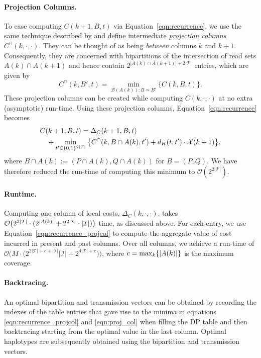 \paragraph{Projection Columns.}
To ease computing $C(k+1,B,t)$ via Equation~\eqref{eqn:recurrence}, we use the same technique described by \cite{Patterson2015} and define intermediate \emph{projection columns} $C^\cap(k,\cdot,\cdot)$.
They can be thought of as being \emph{between} columns $k$ and $k+1$.
Consequently, they are concerned with bipartitions of the intersection of read sets $A(k)\cap A(k+1)$ and hence contain $2^{|A(k)\cap A(k+1)|+2|\mathcal{T}|}$ entries, which are given by
\begin{equation}\label{eqn:proj_col}
C^\cap(k,B',t)=\min_{\mathcal{B}(A(k)):B\simeq B'}\{C(k,B,t)\}.
\end{equation}
These projection columns can be created while computing $C(k,\cdot,\cdot)$ at no extra (asymptotic) run-time.
Using these projection columns, Equation~\eqref{eqn:recurrence} becomes
\begin{align}\label{eqn:recurrence_projcol}
& C(k+1,B,t)= \Delta_C(k+1,B,t)\\
& \quad + \min_{t'\in\{0,1\}^{2{\left\lvert \mathcal{T} \right\rvert}}}\big\{C^\cap(k,B\cap A(k),t')+d_H(t,t')\cdot\mathcal{X}(k+1)\big\}, \nonumber
\end{align}
where $B\cap A(k) := (P\cap A(k), Q\cap A(k))$ for $B=(P,Q)$.
We have therefore reduced the run-time of computing this minimum to $\mathcal{O}(2^{2|\mathcal{T}|})$.

\paragraph{Runtime.}
Computing one column of local costs, $\Delta_C(k,\cdot,\cdot)$, takes $\mathcal{O}\big(2^{2{\left\lvert \mathcal{T} \right\rvert}}\cdot(2^{|A(k)|} +  2^{2|\mathcal{I}|}\cdot |\mathcal{I}|)\big)$ time, as discussed above.
For each entry, we use Equation~\eqref{eqn:recurrence_projcol} to compute the aggregate value of cost incurred in present and past columns.
Over all columns, we achieve a run-time of 
$\mathcal{O}\big(M\cdot \big(2^{2|\mathcal{T}|+c+|\mathcal{I}|}|\mathcal{I}|+2^{4|\mathcal{T}|+c}\big)\big)$, where $c=\max_k\{{\left\lvert A(k) \right\rvert}\}$ is the maximum coverage.

\paragraph{Backtracing.}
An optimal bipartition and transmission vectors can be obtained by recording the indexes of the table entries that gave rise to the minima in equations \eqref{eqn:recurrence_projcol} and \eqref{eqn:proj_col} when filling the DP table and then backtracing starting from the optimal value in the last column.
Optimal haplotypes are subsequently obtained using the bipartition and transmission vectors.



